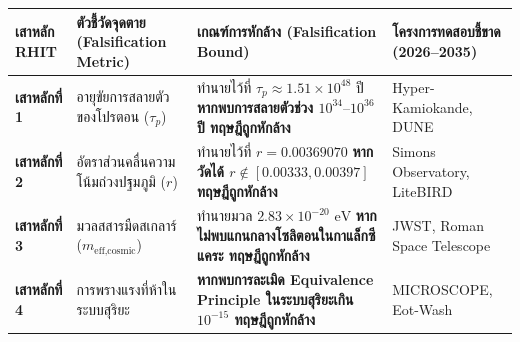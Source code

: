 \documentclass[11pt, a4paper]{article}
\begin{document}
\begin{center}
\begin{tabular}{p{2.4cm}p{3.8cm}p{5.5cm}p{3.5cm}}
\toprule
\textbf{เสาหลัก RHIT} & \textbf{ตัวชี้วัดจุดตาย (Falsification Metric)} & \textbf{เกณฑ์การหักล้าง (Falsification Bound)} & \textbf{โครงการทดสอบชี้ขาด (2026--2035)} \\
\midrule
\textbf{เสาหลักที่ 1} & อายุขัยการสลายตัวของโปรตอน ($\tau_p$) & ทำนายไว้ที่ $\tau_p \approx 1.51 \times 10^{48}$ ปี \textbf{หากพบการสลายตัวช่วง $10^{34}\text{--}10^{36}$ ปี ทฤษฎีถูกหักล้าง} & Hyper-Kamiokande, DUNE \\
\rowcolor{rowtint}
\textbf{เสาหลักที่ 2} & อัตราส่วนคลื่นความโน้มถ่วงปฐมภูมิ ($r$) & ทำนายไว้ที่ $r = 0.00369070$ \textbf{หากวัดได้ $r \notin [0.00333, 0.00397]$ ทฤษฎีถูกหักล้าง} & Simons Observatory, LiteBIRD \\
\textbf{เสาหลักที่ 3} & มวลสสารมืดสเกลาร์ ($m_{\text{eff,cosmic}}$) & ทำนายมวล $2.83 \times 10^{-20}\text{ eV}$ \textbf{หากไม่พบแกนกลางโซลิตอนในกาแล็กซีแคระ ทฤษฎีถูกหักล้าง} & JWST, Roman Space Telescope \\
\rowcolor{rowtint}
\textbf{เสาหลักที่ 4} & การพรางแรงที่ห้าในระบบสุริยะ & \textbf{หากพบการละเมิด Equivalence Principle ในระบบสุริยะเกิน $10^{-15}$ ทฤษฎีถูกหักล้าง} & MICROSCOPE, Eot-Wash \\
\bottomrule
\end{tabular}
\end{center}
\end{document}
